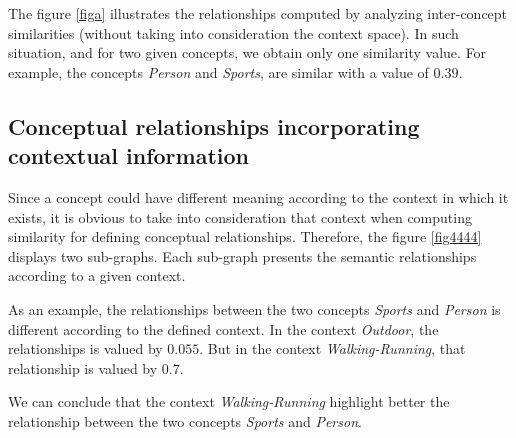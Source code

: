 The figure \ref{figa}  illustrates the relationships computed by analyzing inter-concept similarities (without taking into consideration the context space). In such situation,  and for two given concepts, we obtain only one similarity value. For example, the concepts \textit{Person} and \textit{Sports}, are similar with a value of $0.39$.

		

	\subsection{Conceptual relationships incorporating contextual information}

Since a concept could have different meaning according to the context in which it exists, it is obvious to take into consideration that context when computing similarity for defining conceptual relationships. Therefore, the figure \ref{fig4444} displays two sub-graphs. Each sub-graph presents the semantic relationships according to a given context.

As an example, the relationships between the two concepts \textit{Sports} and \textit{Person} is different according to the defined context. In the context \textit{ Outdoor}, the relationships is valued by $0.055$. But in the context \textit{ Walking-Running}, that relationship is valued by $0.7$.

We can conclude that the context \textit{ Walking-Running} highlight better the relationship between the two concepts \textit{Sports} and \textit{Person}. 
		


